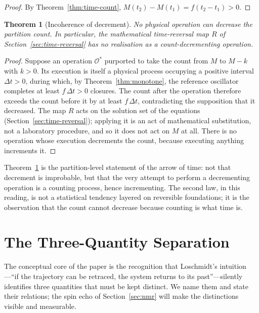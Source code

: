\documentclass[11pt,a4paper]{article}
\theoremstyle{thmstyle}
\newtheorem{theorem}{Theorem}[section]
\theoremstyle{definition}
\theoremstyle{remark}
\newcommand{\Obs}{\mathcal{O}}
\newcommand{\Count}{M}
\begin{document}
\begin{proof}
By Theorem~\ref{thm:time-count}, $\Count(t_{2})-\Count(t_{1})=f(t_{2}-t_{1})>0$.
\end{proof}

\begin{theorem}[Incoherence of decrement]
\label{thm:incoherence}
No physical operation can decrease the partition count. In particular,
the mathematical time-reversal map $R$ of Section~\ref{sec:time-reversal}
has no realisation as a count-decrementing operation.
\end{theorem}

\begin{proof}
Suppose an operation $\Obs^{*}$ purported to take the count from
$\Count$ to $\Count-k$ with $k>0$. Its execution is itself a physical
process occupying a positive interval $\Delta t>0$, during which, by
Theorem~\ref{thm:monotone}, the reference oscillator completes at least
$f\,\Delta t>0$ closures. The count after the operation therefore exceeds
the count before it by at least $f\,\Delta t$, contradicting the
supposition that it decreased. The map $R$ acts on the solution set of
the equations (Section~\ref{sec:time-reversal}); applying it is an act of
mathematical substitution, not a laboratory procedure, and so it does not
act on $\Count$ at all. There is no operation whose execution decrements
the count, because executing anything increments it.
\end{proof}

Theorem~\ref{thm:incoherence} is the partition-level statement of the
arrow of time: not that decrement is improbable, but that the very
attempt to perform a decrementing operation is a counting process, hence
incrementing. The second law, in this reading, is not a statistical
tendency layered on reversible foundations; it is the observation that
the count cannot decrease because counting is what time is.

\section{The Three-Quantity Separation}
\label{sec:three-quantities}

The conceptual core of the paper is the recognition that Loschmidt's
intuition---``if the trajectory can be retraced, the system returns to
its past''---silently identifies three quantities that must be kept
distinct. We name them and state their relations; the spin echo of
Section~\ref{sec:nmr} will make the distinctions visible and measurable.
\end{document}
